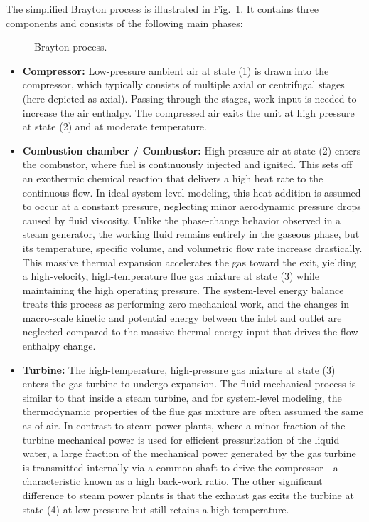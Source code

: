 The simplified Brayton process is illustrated in Fig.~\ref{fig:brayton-process}. It contains three components and consists of the following main phases: 
\begin{figure}[!htb]
    \centering
    
    \caption{Brayton process.}
    \label{fig:brayton-process}
\end{figure}
\begin{itemize}
    \item[1--2] \textbf{Compressor:} Low-pressure ambient air at state (1) is drawn into the compressor, which typically consists of multiple axial or centrifugal stages (here depicted as axial). Passing through the stages, work input is needed to increase the air enthalpy. The compressed air exits the unit at high pressure at state (2) and at moderate temperature. 

    \item[2--3] \textbf{Combustion chamber / Combustor:} High-pressure air at state (2) enters the combustor, where fuel is continuously injected and ignited. This sets off an exothermic chemical reaction that delivers a high heat rate to the continuous flow. In ideal system-level modeling, this heat addition is assumed to occur at a constant pressure, neglecting minor aerodynamic pressure drops caused by fluid viscosity. Unlike the phase-change behavior observed in a steam generator, the working fluid remains entirely in the gaseous phase, but its temperature, specific volume, and volumetric flow rate increase drastically. This massive thermal expansion accelerates the gas toward the exit, yielding a high-velocity, high-temperature flue gas mixture at state (3) while maintaining the high operating pressure. The system-level energy balance treats this process as performing zero mechanical work, and the changes in macro-scale kinetic and potential energy between the inlet and outlet are neglected compared to the massive thermal energy input that drives the flow enthalpy change.

    \item[3--4] \textbf{Turbine:} The high-temperature, high-pressure gas mixture at state (3) enters the gas turbine to undergo expansion. The fluid mechanical process is similar to that inside a steam turbine, and for system-level modeling, the thermodynamic properties of the flue gas mixture are often assumed the same as of air. In contrast to steam power plants, where a minor fraction of the turbine mechanical power is used for efficient pressurization of the liquid water, a large fraction of the mechanical power generated by the gas turbine is transmitted internally via a common shaft to drive the compressor---a characteristic known as a high back-work ratio. The other significant difference to steam power plants is that the exhaust gas exits the turbine at state (4) at low pressure but still retains a high temperature. 
\end{itemize}

